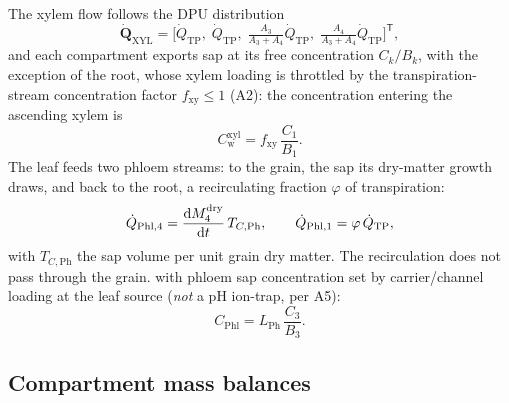 \documentclass[12pt,a4paper]{article}
\newcommand{\Cw}{C_{\mathrm{w}}}
\begin{document}
The xylem flow follows the DPU distribution
\begin{equation}\label{eq:Qxyl}
    \dot{\mathbf Q}_\mathrm{XYL}=\Big[\dot Q_\mathrm{TP},\;\dot Q_\mathrm{TP},\;\tfrac{A_3}{A_3+A_4}\dot Q_\mathrm{TP},\;\tfrac{A_4}{A_3+A_4}\dot Q_\mathrm{TP}\Big]^{\mathsf T},
\end{equation}
and each compartment exports sap at its free concentration $C_k/B_k$, with the exception of the root, whose xylem loading is throttled by the transpiration-stream concentration factor $f_\mathrm{xy}\le1$ (A2): the concentration entering the ascending xylem is
\begin{equation}\label{eq:Cxyl}
    \Cw^{\mathrm{xyl}}=f_\mathrm{xy}\,\frac{C_1}{B_1}.
\end{equation}
The leaf feeds two phloem streams: to the grain, the sap its dry-matter growth draws, and back to the root, a recirculating fraction $\varphi$ of transpiration:
\begin{equation}\label{eq:Qphl}
    \dot Q_\mathrm{Phl,4}=\dv{M_4^\mathrm{dry}}{t}\,T_{C,\mathrm{Ph}},\qquad
    \dot Q_\mathrm{Phl,1}=\varphi\,\dot Q_\mathrm{TP},
\end{equation}
with $T_{C,\mathrm{Ph}}$ the sap volume per unit grain dry matter. The recirculation does not pass through the grain.
with phloem sap concentration set by carrier/channel loading at the leaf source (\emph{not} a pH ion-trap, per A5):
\begin{equation}\label{eq:Cphl}
    C_\mathrm{Phl}=L_\mathrm{Ph}\,\frac{C_3}{B_3}.
\end{equation}

\subsection{Compartment mass balances}
\end{document}
